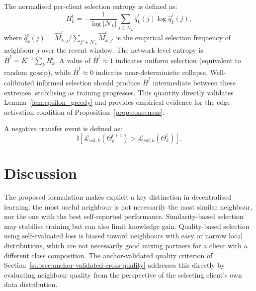 \documentclass[conference]{IEEEtran}
\begin{document}
The normalised per-client selection entropy is defined as:
\begin{equation}
    H_k^t
    =
    -\frac{1}{\log|\mathcal{N}_k|}
    \sum_{j\in\mathcal{N}_k}
    \hat{q}_k^t(j)\log\hat{q}_k^t(j),
    \label{eq:per_client_entropy}
\end{equation}
where $\hat{q}_k^t(j) = \hat{M}_{k,j}^t / \sum_{j'\in\mathcal{N}_k}\hat{M}_{k,j'}^t$ is the empirical selection frequency of neighbour $j$ over the recent window. The network-level entropy is $\bar{H}^t = K^{-1}\sum_k H_k^t$. A value of $\bar{H}^t \approx 1$ indicates uniform selection (equivalent to random gossip), while $\bar{H}^t \approx 0$ indicates near-deterministic collapse. Well-calibrated informed selection should produce $\bar{H}^t$ intermediate between these extremes, stabilising as training progresses. This quantity directly validates Lemma~\ref{lem:epsilon_greedy} and provides empirical evidence for the edge-activation condition of Proposition~\ref{prop:consensus}.

A negative transfer event is defined as:
\begin{equation}
    \mathbb{I}\left[
    \mathcal{L}_{val,k}(\Theta_k^{t+1})
    >
    \mathcal{L}_{val,k}(\Theta_k^{t})
    \right].
    \label{eq:auto-102}
\end{equation}

\section{Discussion}
\label{sec:discussion}

The proposed formulation makes explicit a key distinction in decentralised learning: the most useful neighbour is not necessarily the most similar neighbour, nor the one with the best self-reported performance. Similarity-based selection may stabilise training but can also limit knowledge gain. Quality-based selection using self-evaluated loss is biased toward neighbours with easy or narrow local distributions, which are not necessarily good mixing partners for a client with a different class composition. The anchor-validated quality criterion of Section~\ref{subsec:anchor-validated-cross-quality} addresses this directly by evaluating neighbour quality from the perspective of the selecting client's own data distribution.
\end{document}
